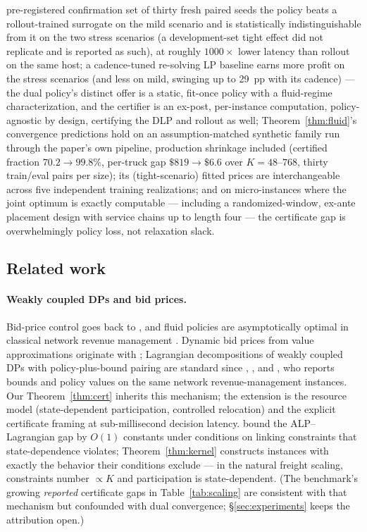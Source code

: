 \documentclass[11pt]{article}
\begin{document}
\begin{enumerate}
  pre-registered confirmation set of thirty fresh paired seeds the
  policy beats a rollout-trained surrogate on the mild scenario and
  is statistically indistinguishable from it on the two stress
  scenarios (a development-set tight effect did not replicate and is
  reported as such), at roughly $1000\times$ lower latency than
  rollout on the same host; a cadence-tuned re-solving LP baseline earns more
  profit on the stress scenarios (and less on mild, swinging up to
  29~pp with its cadence) --- the dual policy's distinct
  offer is a static, fit-once policy with a fluid-regime
  characterization, and the certifier is an ex-post, per-instance
  computation, policy-agnostic by design, certifying the DLP and
  rollout as well; Theorem~\ref{thm:fluid}'s convergence
  predictions hold on an assumption-matched synthetic family run
  through the paper's own pipeline, production shrinkage included
  (certified fraction $70.2 \to 99.8\%$, per-truck gap
  $\$819 \to \$6.6$ over $K = 48$--$768$, thirty train/eval pairs
  per size); its (tight-scenario)
  fitted prices are interchangeable across five independent training
  realizations; and on micro-instances where the joint optimum is
  exactly computable --- including a randomized-window, ex-ante
  placement design with service chains up to length four --- the
  certificate gap is overwhelmingly policy loss, not relaxation
  slack.
\end{enumerate}

\subsection{Related work}
\label{sec:related}

\paragraph{Weakly coupled DPs and bid prices.} Bid-price control goes
back to \citet{talluri1998bidprice}, and fluid policies are
asymptotically optimal in classical network revenue management
\citep{gallego1997network}. Dynamic bid prices from value
approximations originate with \citet{adelman2007dynamic};
Lagrangian decompositions of weakly coupled DPs with policy-plus-bound
pairing are standard since \citet{hawkins2003lagrangian},
\citet{adelman2008relaxations}, and \citet{topaloglu2009lagrangian}, who
reports bounds and policy values on the same network revenue-management
instances. Our Theorem~\ref{thm:cert} inherits this mechanism; the
extension is the resource model (state-dependent participation,
controlled relocation) and the explicit certificate framing at
sub-millisecond decision latency. \citet{brownzhang2023strength} bound
the ALP--Lagrangian gap by $O(1)$ constants under conditions on linking
constraints that state-dependence violates; Theorem~\ref{thm:kernel}
constructs instances with exactly the behavior their conditions
exclude --- in the natural freight scaling, constraints number
$\propto K$ and participation is state-dependent. (The benchmark's
growing \emph{reported} certificate gaps in Table~\ref{tab:scaling}
are consistent with that mechanism but confounded with dual
convergence; \S\ref{sec:experiments} keeps the attribution open.)
\end{document}
